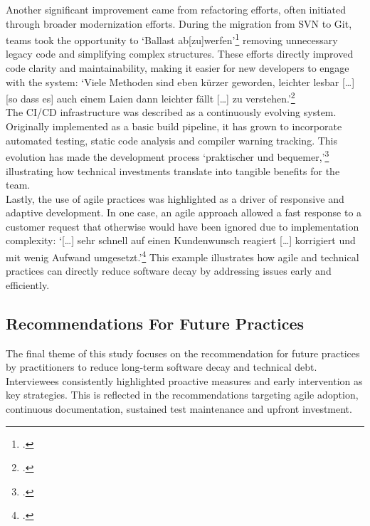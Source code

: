 Another significant improvement came from refactoring efforts, often initiated through broader modernization efforts. During the migration from SVN to Git, teams took the opportunity to `Ballast ab[zu]werfen'\footcite{Interview32025} removing unnecessary legacy code and simplifying complex structures. These efforts directly improved code clarity and maintainability,
making it easier for new developers to engage with the system: `Viele Methoden sind eben kürzer geworden, leichter lesbar [\ldots] [so dass es] auch einem Laien dann leichter fällt [\ldots] zu verstehen.'\footcite{Interview22025}\\

The CI/CD infrastructure was described as a continuously evolving system. Originally implemented as a basic build pipeline, it has grown to incorporate automated testing, static code analysis and compiler warning tracking. This evolution has made the development process `praktischer und bequemer,'\footcite{Interview22025} illustrating how technical
investments translate into tangible benefits for the team.\\

Lastly, the use of agile practices was highlighted as a driver of responsive and adaptive development. In one case, an agile approach allowed a fast response to a customer request that otherwise would have been ignored due to implementation complexity: `[\ldots] sehr schnell auf einen Kundenwunsch reagiert [\ldots] korrigiert und mit wenig Aufwand umgesetzt.'\footcite{Interview32025}
This example illustrates how agile and technical practices can directly reduce software decay by addressing issues early and efficiently.\\

\subsection{Recommendations For Future Practices}
The final theme of this study focuses on the recommendation for future practices by practitioners to reduce long-term software decay and technical debt. Interviewees consistently highlighted proactive measures and early intervention as key strategies. This is reflected in the recommendations targeting agile adoption, continuous documentation, sustained test maintenance and upfront investment.

